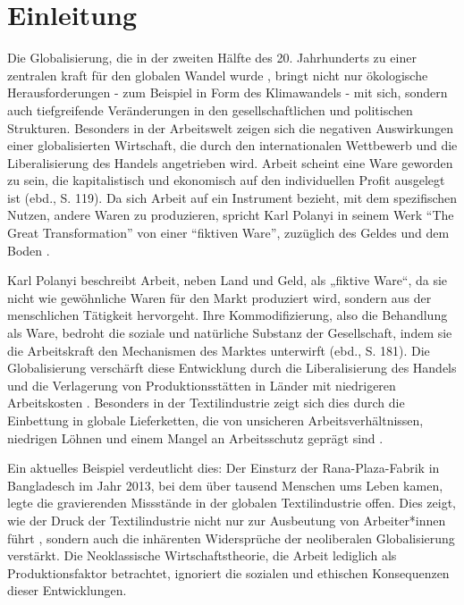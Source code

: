 \documentclass[12pt]{article}
\begin{document}
\section{Einleitung}
Die Globalisierung, die in der zweiten Hälfte des 20. Jahrhunderts zu einer zentralen kraft für den globalen Wandel wurde \autocite[120]{polanyi_levitt_transformations_2019}, bringt nicht nur ökologische Herausforderungen - zum Beispiel in Form des Klimawandels - mit sich, sondern auch tiefgreifende Veränderungen in den gesellschaftlichen und politischen Strukturen. Besonders in der Arbeitswelt zeigen sich die negativen Auswirkungen einer globalisierten Wirtschaft, die durch den internationalen Wettbewerb und die Liberalisierung des Handels angetrieben wird. Arbeit scheint eine Ware geworden zu sein, die kapitalistisch und ekonomisch auf den individuellen Profit ausgelegt ist (ebd., S. 119). Da sich Arbeit auf ein Instrument bezieht, mit dem spezifischen Nutzen, andere Waren zu produzieren, spricht Karl Polanyi in seinem Werk \enquote{The Great Transformation} von einer \enquote{fiktiven Ware}, zuzüglich des Geldes und dem Boden \autocite[181]{ebner_karl_2021}.

Karl Polanyi beschreibt Arbeit, neben Land und Geld, als „fiktive Ware“, da sie nicht wie gewöhnliche Waren für den Markt produziert wird, sondern aus der menschlichen Tätigkeit hervorgeht. Ihre Kommodifizierung, also die Behandlung als Ware, bedroht die soziale und natürliche Substanz der Gesellschaft, indem sie die Arbeitskraft den Mechanismen des Marktes unterwirft (ebd., S. 181). Die Globalisierung verschärft diese Entwicklung durch die Liberalisierung des Handels und die Verlagerung von Produktionsstätten in Länder mit niedrigeren Arbeitskosten \autocite[124]{polanyi_levitt_transformations_2019}. Besonders in der Textilindustrie zeigt sich dies durch die Einbettung in globale Lieferketten, die von unsicheren Arbeitsverhältnissen, niedrigen Löhnen und einem Mangel an Arbeitsschutz geprägt sind \autocite{bmz_umwelt-_2024}.

Ein aktuelles Beispiel verdeutlicht dies: Der Einsturz der Rana-Plaza-Fabrik in Bangladesch im Jahr 2013, bei dem über tausend Menschen ums Leben kamen, legte die gravierenden Missstände in der globalen Textilindustrie offen. Dies zeigt, wie der Druck der Textilindustrie nicht nur zur Ausbeutung von Arbeiter*innen führt \autocite{bildung_vor_2018}, sondern auch die inhärenten Widersprüche der neoliberalen Globalisierung verstärkt. Die Neoklassische Wirtschaftstheorie, die Arbeit lediglich als Produktionsfaktor betrachtet, ignoriert die sozialen und ethischen Konsequenzen dieser Entwicklungen.
\end{document}
